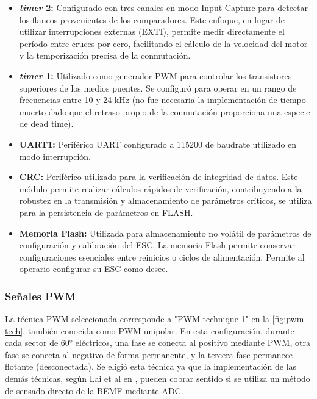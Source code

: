 \begin{itemize}
    \item \textbf{\textit{timer} 2:} Configurado con tres canales en modo Input Capture para detectar los flancos provenientes de los comparadores. Este enfoque, en lugar de utilizar interrupciones externas (EXTI), permite medir directamente el período entre cruces por cero, facilitando el cálculo de la velocidad del motor y la temporización precisa de la conmutación.
    
    \item \textbf{\textit{timer} 1:} Utilizado como generador PWM para controlar los transistores superiores de los medios puentes. Se configuró para operar en un rango de frecuencias entre 10 y 24 kHz (no fue necesaria la implementación de tiempo muerto dado que el retraso propio de la conmutación proporciona una especie de dead time).
    
    \item \textbf{UART1:} Periférico UART configurado a 115200 de baudrate utilizado en modo interrupción.
    
\item \textbf{CRC:} Periférico utilizado para la verificación de integridad de datos. Este módulo permite realizar cálculos rápidos de verificación, contribuyendo a la robustez en la transmisión y almacenamiento de parámetros críticos, se utiliza para la persistencia de parámetros en FLASH.

\item \textbf{Memoria Flash:} Utilizada para almacenamiento no volátil de parámetros de configuración y calibración del ESC. La memoria Flash permite conservar configuraciones esenciales entre reinicios o ciclos de alimentación. Permite al operario configurar su ESC como desee.
    
    
\end{itemize}
\subsubsection{Señales PWM}
La técnica PWM seleccionada corresponde a "PWM technique 1" en la \cref{fig:pwm-tech}, también conocida como PWM unipolar. En esta configuración, durante cada sector de 60° eléctricos, una fase se conecta al positivo mediante PWM, otra fase se conecta al negativo de forma permanente, y la tercera fase permanece flotante (desconectada).  
Se eligió esta técnica ya que la implementación de las demás técnicas, según Lai et al en \cite{Lai2011}, pueden cobrar sentido si se utiliza un método de sensado directo de la BEMF mediante ADC.

